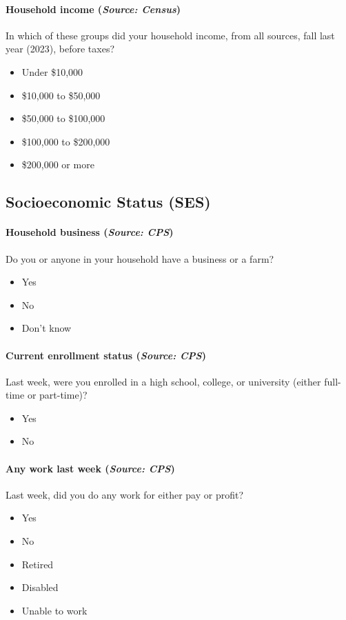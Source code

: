 \paragraph{Household income (\textit{Source: Census})}
In which of these groups did your household income, from all sources, fall last year (2023), before taxes?
\begin{itemize}[itemsep=-10pt,topsep=0pt]
\item Under \$10,000
\item \$10,000 to \$50,000
\item \$50,000 to \$100,000
\item \$100,000 to \$200,000
\item \$200,000 or more
\end{itemize}


\subsection{Socioeconomic Status (SES)}

\paragraph{Household business (\textit{Source: CPS})}
Do you or anyone in your household have a business or a farm?
\begin{itemize}[itemsep=-10pt,topsep=0pt]
\item Yes
\item No
\item Don’t know
\end{itemize}

\paragraph{Current enrollment status (\textit{Source: CPS})}
Last week, were you enrolled in a high school, college, or university (either full-time or part-time)?
\begin{itemize}[itemsep=-10pt,topsep=0pt]
\item Yes
\item No
\end{itemize}

\paragraph{Any work last week (\textit{Source: CPS})}
Last week, did you do any work for either pay or profit?
\begin{itemize}[itemsep=-10pt,topsep=0pt]
\item Yes
\item No
\item Retired
\item Disabled
\item Unable to work
\end{itemize}


